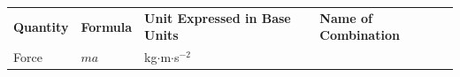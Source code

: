 {\begin{center}
\begin{xtabular*}{\mytablewidth}[t]{|p{10\mystarwidth}|p{10\mystarwidth}|p{10\mystarwidth}|p{10\mystarwidth}|}
    
        
                \textbf{Quantity}
               &
    
    
        
                \textbf{Formula}
               &
    
    
        
                \textbf{Unit Expressed in Base Units}
               &
    
    
        
                \textbf{Name of Combination}
     \tabularnewline{}
    
    
        Force &
    
    
        
                \begin{math}ma\end{math}
               &
    
    
        kg\begin{math}\ensuremath{\cdot}\end{math}m\begin{math}\ensuremath{\cdot}\end{math}s\begin{math}{}^{-2}\end{math} &
    

\end{xtabular*}
\end{center}}
